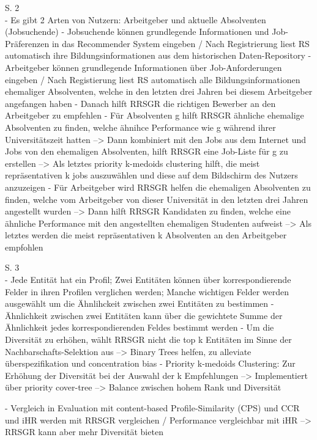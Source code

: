 S. 2\\
- Es gibt 2 Arten von Nutzern: Arbeitgeber und aktuelle Absolventen (Jobsuchende)
- Jobsuchende können grundlegende Informationen und Job-Präferenzen in das Recommender System eingeben / Nach Registrierung liest RS automatisch ihre Bildungsinformationen aus dem historischen Daten-Repository
- Arbeitgeber können grundlegende Informationen über Job-Anforderungen eingeben / Nach Registierung liest RS automatisch alle Bildungsinformationen ehemaliger Absolventen, welche in den letzten drei Jahren bei diesem Arbeitgeber angefangen haben
- Danach hilft RRSGR die richtigen Bewerber an den Arbeitgeber zu empfehlen
- Für Absolventen g hilft RRSGR ähnliche ehemalige Absolventen zu finden, welche ähnihce Performance wie g während ihrer Universitätszeit hatten --> Dann kombiniert mit den Jobs aus dem Internet und Jobs von den ehemaligen Absolventen, hilft RRSGR eine Job-Liste für g zu erstellen --> Als letztes priority k-medoids clustering hilft, die meist repräsentativen k jobs auszuwählen und diese auf dem Bildschirm des Nutzers anzuzeigen
- Für Arbeitgeber wird RRSGR helfen die ehemaligen Absolventen zu finden, welche vom Arbeitgeber von dieser Universität in den letzten drei Jahren angestellt wurden --> Dann hilft RRSGR Kandidaten zu finden, welche eine ähnliche Performance mit den angestellten ehemaligen Studenten aufweist --> Als letztes werden die meist repräsentativen k Absolventen an den Arbeitgeber empfohlen

S. 3\\
- Jede Entität hat ein Profil; Zwei Entitäten können über korrespondierende Felder in ihren Profilen verglichen werden; Manche wichtigen Felder werden ausgewählt um die Ähnlihckeit zwischen zwei Entitäten zu bestimmen
- Ähnlichkeit zwischen zwei Entitäten kann über die gewichtete Summe der Ähnlichkeit jedes korrespondierenden Feldes bestimmt werden
- Um die Diversität zu erhöhen, wählt RRSGR nicht die top k Entitäten im Sinne der Nachbarschafts-Selektion aus --> Binary Trees helfen, zu alleviate überspezifikation und concentration bias
- Priority k-medoids Clustering: Zur Erhöhung der Diversität bei der Auswahl der k Empfehlungen --> Implementiert über priority cover-tree --> Balance zwischen hohem Rank und Diversität

- Vergleich in Evaluation mit content-based Profile-Similarity (CPS) und CCR und iHR werden mit RRSGR vergleichen / Performance vergleichbar mit iHR --> RRSGR kann aber mehr Diversität bieten

